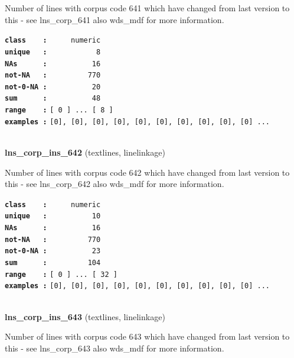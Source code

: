 \documentclass[]{article}
\begin{document}
Number of lines with corpus code 641 which have changed from last
version to this - see lns\_corp\_641 also wds\_mdf for more information.

\textbf{\texttt{class\ \ \ \ :}} \texttt{~~~~~numeric}\\
\textbf{\texttt{unique\ \ \ :}} \texttt{~~~~~~~~~~~8}\\
\textbf{\texttt{NAs\ \ \ \ \ \ :}} \texttt{~~~~~~~~~~16}\\
\textbf{\texttt{not-NA\ \ \ :}} \texttt{~~~~~~~~~770}\\
\textbf{\texttt{not-0-NA\ :}} \texttt{~~~~~~~~~~20}\\
\textbf{\texttt{sum\ \ \ \ \ \ :}} \texttt{~~~~~~~~~~48}\\
\textbf{\texttt{range\ \ \ \ :}}
\texttt{{[}\ 0\ {]}\ ...\ {[}\ 8\ {]}}\\
\textbf{\texttt{examples\ :}}
\texttt{{[}0{]},\ {[}0{]},\ {[}0{]},\ {[}0{]},\ {[}0{]},\ {[}0{]},\ {[}0{]},\ {[}0{]},\ {[}0{]},\ {[}0{]}\ ...}\\

~

\textbf{lns\_corp\_ins\_642} (textlines, linelinkage)

Number of lines with corpus code 642 which have changed from last
version to this - see lns\_corp\_642 also wds\_mdf for more information.

\textbf{\texttt{class\ \ \ \ :}} \texttt{~~~~~numeric}\\
\textbf{\texttt{unique\ \ \ :}} \texttt{~~~~~~~~~~10}\\
\textbf{\texttt{NAs\ \ \ \ \ \ :}} \texttt{~~~~~~~~~~16}\\
\textbf{\texttt{not-NA\ \ \ :}} \texttt{~~~~~~~~~770}\\
\textbf{\texttt{not-0-NA\ :}} \texttt{~~~~~~~~~~23}\\
\textbf{\texttt{sum\ \ \ \ \ \ :}} \texttt{~~~~~~~~~104}\\
\textbf{\texttt{range\ \ \ \ :}}
\texttt{{[}\ 0\ {]}\ ...\ {[}\ 32\ {]}}\\
\textbf{\texttt{examples\ :}}
\texttt{{[}0{]},\ {[}0{]},\ {[}0{]},\ {[}0{]},\ {[}0{]},\ {[}0{]},\ {[}0{]},\ {[}0{]},\ {[}0{]},\ {[}0{]}\ ...}\\

~

\textbf{lns\_corp\_ins\_643} (textlines, linelinkage)

Number of lines with corpus code 643 which have changed from last
version to this - see lns\_corp\_643 also wds\_mdf for more information.
\end{document}
